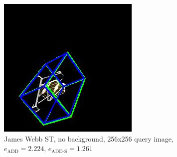 \begin{figure}[h]
\begin{minipage}{0.45\linewidth}
        \includegraphics[width=\linewidth]{data/fig8.jpg} %
        \caption{James Webb ST, no background, 256x256 query image, $e_\mathrm{ADD}=2.224$, $e_{\mathrm{ADD}\text{-}\mathrm{S}}=1.261$ }
        \label{fig:fig8}
    \end{minipage}
\end{figure}

\bigskip

